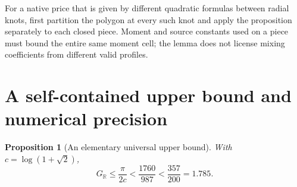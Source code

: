 \documentclass[11pt]{article}
\newtheorem{proposition}[theorem]{Proposition}
\begin{document}
For a native price that is given by different quadratic formulas
between radial knots, first partition the polygon at every such
knot and apply the proposition separately to each closed piece.
Moment and source constants used on a piece must bound the entire
same moment cell; the lemma does not license mixing coefficients
from different valid profiles.

\section{A self-contained upper bound and numerical precision}
\begin{proposition}[An elementary universal upper bound]
\label{prop:new-self-contained-upper}
With $c=\log(1+\sqrt2)$,
\[
 G_{\mathbb R}\leq\frac{\pi}{2c}
                <\frac{1760}{987}<\frac{357}{200}=1.785.
\]
\end{proposition}
\end{document}
